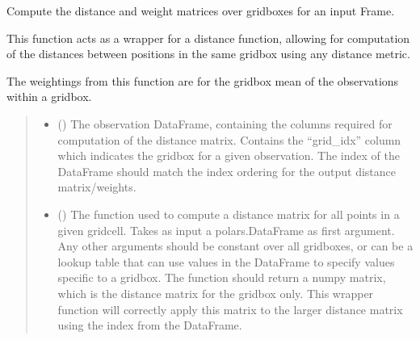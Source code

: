 \documentclass[letterpaper,10pt,english]{sphinxmanual}
\begin{document}
\begin{fulllineitems}
\label{\detokenize{error_covariance:glomar_gridding.error_covariance.dist_weight}}
\pysigstartsignatures
\pysiglinewithargsret
{}
{\sphinxparamcomma {}\sphinxparamcomma {}\sphinxparamcomma {}}
{}
\pysigstopsignatures
\sphinxAtStartPar
Compute the distance and weight matrices over gridboxes for an input Frame.

\sphinxAtStartPar
This function acts as a wrapper for a distance function, allowing for
computation of the distances between positions in the same gridbox using any
distance metric.

\sphinxAtStartPar
The weightings from this function are for the gridbox mean of the
observations within a gridbox.
\begin{quote}\begin{description}
\begin{itemize}
\item {}
\sphinxAtStartPar
{} () \textendash{} The observation DataFrame, containing the columns required for
computation of the distance matrix. Contains the “grid\_idx” column which
indicates the gridbox for a given observation. The index of the
DataFrame should match the index ordering for the output distance
matrix/weights.

\item {}
\sphinxAtStartPar
{} () \textendash{}
\sphinxAtStartPar
The function used to compute a distance matrix for all points in a given
grid\sphinxhyphen{}cell. Takes as input a polars.DataFrame as first argument. Any
other arguments should be constant over all gridboxes, or can be a
look\sphinxhyphen{}up table that can use values in the DataFrame to specify values
specific to a gridbox. The function should return a numpy matrix, which
is the distance matrix for the gridbox only. This wrapper function will
correctly apply this matrix to the larger distance matrix using the
index from the DataFrame.


\end{itemize}
\end{description}
\end{quote}
\end{fulllineitems}
\end{document}
